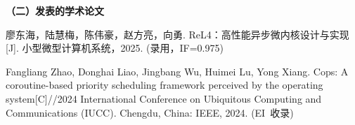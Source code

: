 
\begin{publications}{99}
 \noindent\textbf{（二）发表的学术论文}
 \begin{publist}
 \item  廖东海，陆慧梅，陈伟豪，赵方亮，向勇. ReL4：高性能异步微内核设计与实现[J]. 小型微型计算机系统，2025. (录用，IF=0.975)
 \item  Fangliang Zhao, Donghai Liao, Jingbang Wu, Huimei Lu, Yong Xiang. Cops: A coroutine-based priority scheduling framework perceived by the operating system[C]//2024 International Conference on Ubiquitous Computing and Communications (IUCC). Chengdu, China: IEEE, 2024. (EI~收录)
 \end{publist}

    
\end{publications}
